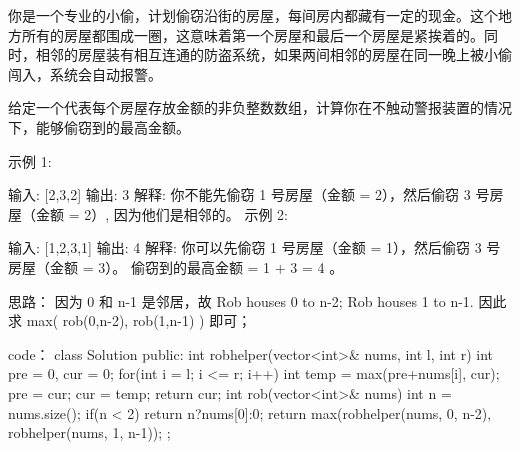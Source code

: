 你是一个专业的小偷，计划偷窃沿街的房屋，每间房内都藏有一定的现金。这个地方所有的房屋都围成一圈，这意味着第一个房屋和最后一个房屋是紧挨着的。同时，相邻的房屋装有相互连通的防盗系统，如果两间相邻的房屋在同一晚上被小偷闯入，系统会自动报警。

给定一个代表每个房屋存放金额的非负整数数组，计算你在不触动警报装置的情况下，能够偷窃到的最高金额。

示例 1:

输入: [2,3,2]
输出: 3
解释: 你不能先偷窃 1 号房屋（金额 = 2），然后偷窃 3 号房屋（金额 = 2）, 因为他们是相邻的。
示例 2:

输入: [1,2,3,1]
输出: 4
解释: 你可以先偷窃 1 号房屋（金额 = 1），然后偷窃 3 号房屋（金额 = 3）。
     偷窃到的最高金额 = 1 + 3 = 4 。

























思路：
因为 0 和 n-1 是邻居，故 
Rob houses 0 to n-2;
Rob houses 1 to n-1.
因此求 max( rob(0,n-2), rob(1,n-1) ) 即可；






















code：
class Solution {
public:
    int robhelper(vector<int>& nums, int l, int r)
    {
        int pre = 0, cur = 0;
        for(int i = l; i <= r; i++)
        {
            int temp = max(pre+nums[i], cur);
            pre = cur;
            cur = temp;
        }
        return cur;
    }
    int rob(vector<int>& nums) {
        int n = nums.size();
        if(n < 2) return n?nums[0]:0;
        return max(robhelper(nums, 0, n-2), robhelper(nums, 1, n-1));
    }
};